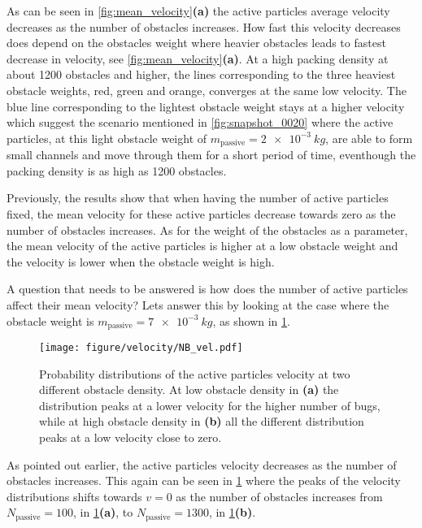 As can be seen in \cref{fig:mean_velocity}\textbf{(a)} 
the active particles average velocity decreases as the number 
of obstacles increases. How fast this velocity decreases does 
depend on the obstacles weight where heavier obstacles 
leads to fastest decrease in velocity, see \cref{fig:mean_velocity}\textbf{(a)}. 
At a high packing density at about \num{1200} obstacles and higher, 
the lines corresponding to the three heaviest obstacle weights, 
red, green and orange, converges at the same low velocity. 
The blue line corresponding to the lightest obstacle weight stays at a higher velocity 
which suggest the scenario mentioned in \cref{fig:snapshot_0020} where the 
active particles, at this light obstacle weight of $m_{\text{passive}}=\SI{2e-3}{kg}$, 
are able to form small channels and move through them for a short period of time, 
eventhough the packing density is as high as \num{1200} obstacles.

Previously, the results show that when having the number of active particles fixed, 
the mean velocity for these active particles decrease towards zero as the number of 
obstacles increases. As for the weight of the obstacles as a parameter, 
the mean velocity of the active particles is higher at a low obstacle weight 
and the velocity is lower when the obstacle weight is high. 

A question that needs to be answered is how does the number of active particles 
affect their mean velocity? Lets answer this by looking at the case where 
the obstacle weight is $m_{\text{passive}}=\SI{7e-3}{kg}$, as shown in \cref{fig:velkde_1WNCNB}.

\begin{figure}[htbp]
    \centering
    \texttt{[image: figure/velocity/NB\_vel.pdf]}
    \caption{Probability distributions of the active particles 
    velocity at two different obstacle density. At low obstacle 
    density in \textbf{(a)} the distribution peaks at a lower 
    velocity for the higher number of bugs, while at high obstacle 
    density in \textbf{(b)} all the different distribution peaks at 
    a low velocity close to zero.} 
    \label{fig:velkde_1WNCNB}
\end{figure}

As pointed out earlier, the active particles velocity decreases as 
the number of obstacles increases. This again can be seen in 
\cref{fig:velkde_1WNCNB} where the peaks of the velocity 
distributions shifts towards $v=0$ as the number of obstacles 
increases from $N_{\text{passive}}=100$, in \cref{fig:velkde_1WNCNB}\textbf{(a)}, to 
$N_{\text{passive}}=1300$, in \cref{fig:velkde_1WNCNB}\textbf{(b)}.

